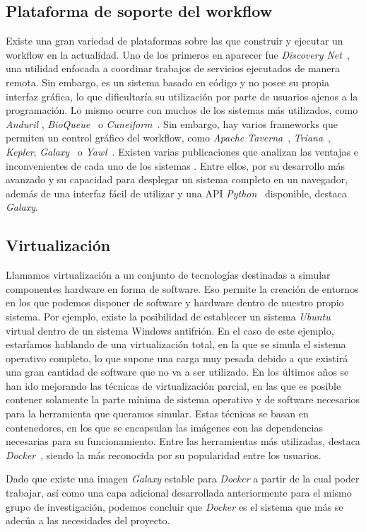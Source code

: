 \subsection{Plataforma de soporte del workflow}
Existe una gran variedad de plataformas sobre las que construir y ejecutar un workflow en la actualidad. Uno de los primeros en aparecer fue \textit{Discovery Net}~\cite{Curcin:2002:DNT:775047.775145}, una utilidad enfocada a coordinar trabajos de servicios ejecutados de manera remota. Sin embargo, es un sistema basado en código y no posee su propia interfaz gráfica, lo que dificultaría su utilización por parte de usuarios ajenos a la programación. Lo mismo ocurre con muchos de los sistemas más utilizados, como \textit{Anduril} \cite{Ovaska2010}, \textit{BioQueue}~ \cite{10.1093/bioinformatics/btx403} o \textit{Cuneiform}~\cite{brandt_reisig_leser_2017}. Sin embargo, hay varios frameworks que permiten un control gráfico del workflow, como \textit{Apache Taverna}~\cite{10.1093/nar/gkt328}, \textit{Triana}~\cite{Taylor2007}, \textit{Kepler}\cite{Ludascher:2006:SWM:1148437.1148454}, \textit{Galaxy}~\cite{Galaxy} o \textit{Yawl}~\cite{yawl2004}. Existen varias publicaciones que analizan las ventajas e inconvenientes de cada uno de los sistemas \cite{4786077, Abouelhoda:2010:MPI:1833398.1833400, Nyronen:2012:DII:2361999.2362006, 10.1093/bib/bbw020}. Entre ellos, por su desarrollo más avanzado y su capacidad para desplegar un sistema completo en un navegador, además de una interfaz fácil de utilizar y una API \textit{Python}~\cite{GalaxyAPI} disponible, destaca \textit{Galaxy}.

\subsection{Virtualización}
Llamamos virtualización a un conjunto de tecnologías destinadas a simular componentes hardware en forma de software. Eso permite la creación de entornos en los que podemos disponer de software y hardware dentro de nuestro propio sistema. Por ejemplo, existe la posibilidad de establecer un sistema \textit{Ubuntu} virtual dentro de un sistema Windows antifrión. En el caso de este ejemplo, estaríamos hablando de una virtualización total, en la que se simula el sistema operativo completo, lo que supone una carga muy pesada debido a que existirá una gran cantidad de software que no va a ser utilizado. En los últimos años se han ido mejorando las técnicas de virtualización parcial, en las que es posible contener solamente la parte mínima de sistema operativo y de software necesarios para la herramienta que queramos simular. Estas técnicas se basan en contenedores, en los que se encapsulan las imágenes con las dependencias necesarias para su funcionamiento. Entre las herramientas más utilizadas, destaca \textit{Docker}~\cite{Docker}, siendo la más reconocida por su popularidad entre los usuarios.

Dado que existe una imagen \textit{Galaxy} estable para \textit{Docker} a partir de la cual poder trabajar, así como una capa adicional desarrollada anteriormente para el mismo grupo de investigación, podemos concluir que \textit{Docker} es el sistema que más se adecúa a las necesidades del proyecto.


\newpage \thispagestyle{empty} %